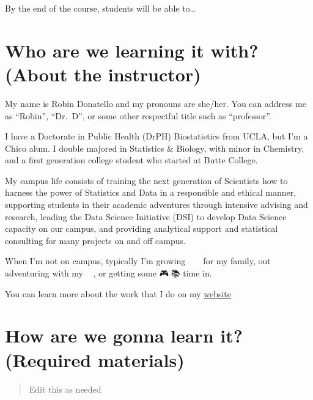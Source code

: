 \documentclass[
]{article}
\begin{document}
By the end of the course, students will be able to\ldots{}

\hypertarget{who-are-we-learning-it-with-about-the-instructor}{%
\section{Who are we learning it with? (About the
instructor)}\label{who-are-we-learning-it-with-about-the-instructor}}

My name is Robin Donatello and my pronouns are she/her. You can address
me as ``Robin'', ``Dr.~D'', or some other respectful title such as
``professor''.

I have a Doctorate in Public Health (DrPH) Biostatistics from UCLA, but
I'm a Chico alum. I double majored in Statistics \& Biology, with minor
in Chemistry, and a first generation college student who started at
Butte College.

My campus life consists of training the next generation of Scientists
how to harness the power of Statistics and Data in a responsible and
ethical manner, supporting students in their academic adventures through
intensive advising and research, leading the Data Science Initiative
(DSI) to develop Data Science capacity on our campus, and providing
analytical support and statistical consulting for many projects on and
off campus.

When I'm not on campus, typically I'm growing 🥕🌾🍅🍆🍏 for my family, out
adventuring with my 🐶🧔🐩, or getting some 🎮🎲📚 time in.

You can learn more about the work that I do on my
\href{http://www.norcalbiostat.com/}{website}

\hypertarget{how-are-we-gonna-learn-it-required-materials}{%
\section{How are we gonna learn it? (Required
materials)}\label{how-are-we-gonna-learn-it-required-materials}}

\begin{quote}
Edit this as needed
\end{quote}
\end{document}
